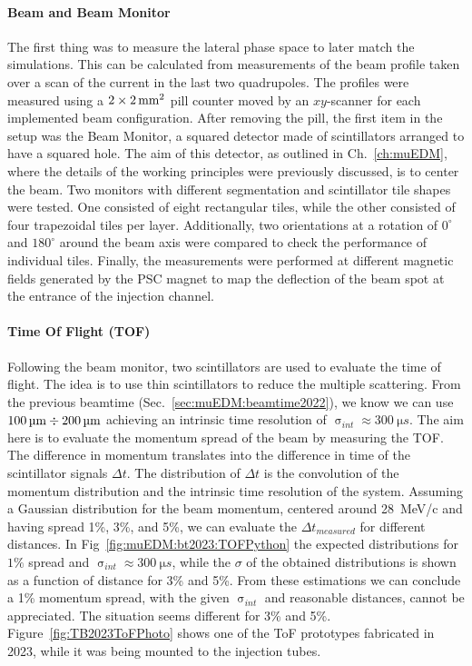 \begin{refsection}
        \paragraph{Beam and Beam Monitor}
        The first thing was to measure the lateral phase space to later match the simulations.
        This can be calculated from measurements of the beam profile taken over a scan of the current in the last two quadrupoles. 
        The profiles were measured using a $2\times\SI{2}{mm\squared}$ pill counter moved by an $xy$-scanner for each implemented beam configuration.
        After removing the pill, the first item in the setup was the Beam Monitor, a squared detector made of scintillators arranged to have a squared hole.
        The aim of this detector, as outlined in Ch.~\ref{ch:muEDM}, where the details of the working principles were previously discussed, is to center the beam.
        Two monitors with different segmentation and scintillator tile shapes were tested.
        One consisted of eight rectangular tiles, while the other consisted of four trapezoidal tiles per layer. 
        Additionally, two orientations at a rotation of $0^{\circ}$ and $180^{\circ}$ around the beam axis were compared to check the performance of individual tiles. 
        Finally, the measurements were performed at different magnetic fields generated by the PSC magnet to map the deflection of the beam spot at the entrance of the injection channel.
        
        \paragraph{Time Of Flight (TOF)}
        Following the beam monitor, two scintillators are used to evaluate the time of flight.
        The idea is to use thin scintillators to reduce the multiple scattering.
        From the previous beamtime (Sec.~\ref{sec:muEDM:beamtime2022}), we know we can use $\SI{100}{\micro m}\divisionsymbol\SI{200}{\micro m}$ achieving an intrinsic time resolution of $\upsigma_{int}\approx\SI{300}{\micro s}$.
        The aim here is to evaluate the momentum spread of the beam by measuring the TOF.
        The difference in momentum translates into the difference in time of the scintillator signals $\Delta t$. 
        The distribution of $\Delta t$ is the convolution of the momentum distribution and the intrinsic time resolution of the system.
        Assuming a Gaussian distribution for the beam momentum, centered around \SI{28}{MeV/c} and having spread 1\%, 3\%, and 5\%, we can evaluate the $\Delta t_{measured}$ for different distances.
        In Fig~\ref{fig:muEDM:bt2023:TOFPython} the expected distributions for $1\%$ spread and $\upsigma_{int}\approx\SI{300}{\micro s}$, while the $\sigma$ of the obtained distributions is shown as a function of distance for 3\% and 5\%.
        From these estimations we can conclude a 1\% momentum spread, with the given $\upsigma_{int}$ and reasonable distances, cannot be appreciated. 
        The situation seems different for 3\% and 5\%.
        Figure~\ref{fig:TB2023ToFPhoto} shows one of the ToF prototypes fabricated in 2023, while it was being mounted to the injection tubes. \\


\end{refsection}
